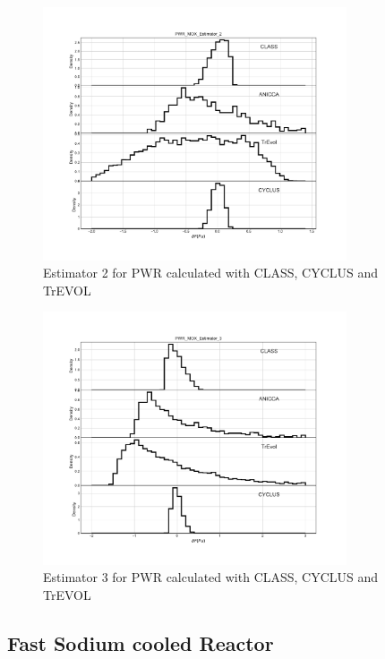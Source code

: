 \begin{figure}[h]
	\begin{center}
		\includegraphics[width = 0.8\textwidth]{../../Feature_1/RAW_DATA/FIG/PWR_MOX_Estimator_2.pdf}
		\caption{Estimator 2 for PWR calculated with CLASS, CYCLUS and TrEVOL}
		\label{fig:Est2_PWR}
	\end{center}
\end{figure}

\begin{figure}[h]
	\begin{center}
		\includegraphics[width = 0.8\textwidth]{../../Feature_1/RAW_DATA/FIG/PWR_MOX_Estimator_3.pdf}
		\caption{Estimator 3 for PWR calculated with CLASS, CYCLUS and TrEVOL}
		\label{fig:Est3_PWR}
	\end{center}
\end{figure}

\subsection{Fast Sodium cooled Reactor}

